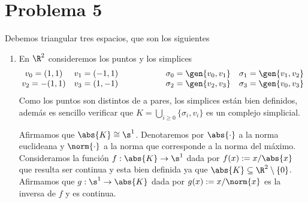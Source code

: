 \documentclass{article}
\begin{document}
\section*{Problema 5}
\noindent Debemos triangular tres espacios, que son los siguientes
\begin{enumerate}
    \item En $\R^{2}$ consideremos los puntos y los simplices
    \begin{equation*}
        \begin{matrix}
            v_{0}=(1,1) & v_{1}=(-1,1) \\
            v_{2}=-(1,1) & v_{3}=(1,-1)
        \end{matrix}
        \hspace{2cm}\begin{matrix}
            \sigma_{0}=\gen{v_{0},v_{1}} & \sigma_{1}=\gen{v_{1},v_{2}} \\
            \sigma_{2}=\gen{v_{2},v_{3}} & \sigma_{3}=\gen{v_{0},v_{3}}
        \end{matrix}
    \end{equation*}
    Como los puntos son distintos de a pares, los simplices están bien definidos, además es 
    sencillo verificar que $K=\bigcup_{i\geq0}\{\sigma_{i},v_{i}\}$ es un complejo simplicial.
    \begin{center} %
    \end{center}
    Afirmamos que $\abs{K}\cong\s^{1}$. Denotaremos por $\abs{\cdot}$ a la norma euclideana y 
    $\norm{\cdot}$ a la norma que corresponde a la norma del máximo. Consideramos la función 
    $f:\abs{K}\to\s^{1}$ dada por $f(x):=x/\abs{x}$ que resulta ser continua y esta bien definida 
    ya que $\abs{K}\subseteq\R^{2}\setminus\{0\}$. Afirmamos que $g:\s^{1}\to\abs{K}$ dada por 
    $g(x):=x/\norm{x}$ es la inversa de $f$ y es continua.


\end{enumerate}
\end{document}
